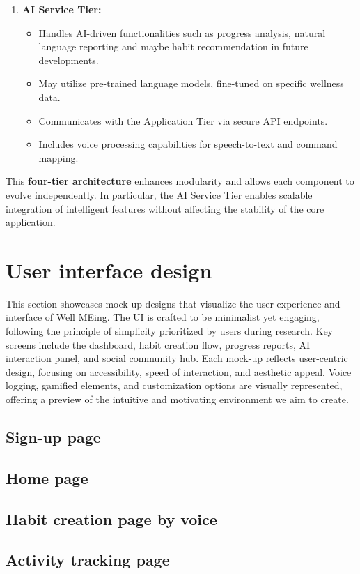 \documentclass{article}
\begin{document}
\begin{enumerate}
    \item \textbf{AI Service Tier:}
    \begin{itemize}
        \item Handles AI-driven functionalities such as progress analysis, natural language reporting and maybe habit recommendation in future developments.
        \item May utilize pre-trained language models, fine-tuned on specific wellness data.
        \item Communicates with the Application Tier via secure API endpoints.
        \item Includes voice processing capabilities for speech-to-text and command mapping.
    \end{itemize}
\end{enumerate}

This \textbf{four-tier architecture} enhances modularity and allows each component to evolve independently. In particular, the AI Service Tier enables scalable integration of intelligent features without affecting the stability of the core application.

\section{User interface design}

This section showcases mock-up designs that visualize the user experience and interface of Well MEing.
The UI is crafted to be minimalist yet engaging, following the principle of simplicity prioritized by users during research.
Key screens include the dashboard, habit creation flow, progress reports, AI interaction panel, and social community hub.
Each mock-up reflects user-centric design, focusing on accessibility, speed of interaction, and aesthetic appeal. Voice logging, gamified elements, and customization options are visually represented, offering a preview of the intuitive and motivating environment we aim to create.

\subsection{Sign-up page}
\subsection{Home page}
\subsection{Habit creation page by voice}
\subsection{Activity tracking page}

\end{document}
